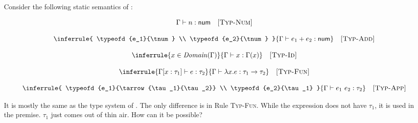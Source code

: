 Consider the following static semantics of \Lang:


\vspace{-1em}

\[
  \Gamma\vdash n:\textsf{num}
  \quad\textsc{[Typ-Num]}
\]


\vspace{-1em}

\[
  \inferrule
  { \typeofd{e_1}{\tnum} \\ \typeofd{e_2}{\tnum} }
  { \typeofd{e_1+e_2}{\tnum} }
  \quad\textsc{[Typ-Add]}
\]


\vspace{-1em}

\[
  \inferrule
  { x\in\dom{\Gamma} }
  { \typeofd{x}{\Gamma(x)} }
  \quad\textsc{[Typ-Id]}
\]


\vspace{-1em}

\[
  \inferrule
  { \typeof{\Gamma[x:\tau_1]}{e}{\tau_2} }
  { \typeofd{\efun{x}{e}}{\tarrow{\tau_1}{\tau_2}} }
  \quad\textsc{[Typ-Fun]}
\]


\vspace{-1em}

\[
  \inferrule
  { \typeofd{e_1}{\tarrow{\tau_1}{\tau_2}} \\
    \typeofd{e_2}{\tau_1} }
  { \typeofd{e_1\ e_2}{\tau_2} }
  \quad\textsc{[Typ-App]}
\]

It is mostly the same as the type system of \plang. The only difference is in Rule
\textsc{Typ-Fun}. While the expression does not have $\tau_1$, it is used in the
premise. $\tau_1$ just comes out of thin air. How can it be possible?

